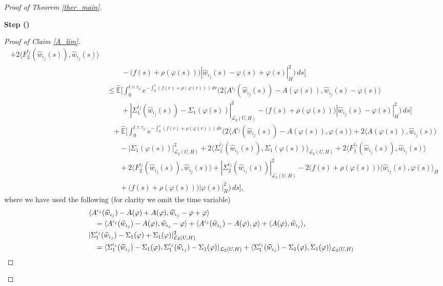 \documentclass[english,a4paper,11pt]{amsart}
\theoremstyle{plain}
\theoremstyle{definition}
\theoremstyle{remark}
\numberwithin{equation}{section}
\newcounter{lil1}
\newenvironment{step}
{\begin{list} { \bf Step (\Roman{lil1})}
		{ \usecounter{lil1}
			\setlength{\leftmargin}{0.0cm}
			\setlength{\topsep}{0.2cm}
			\setlength{\itemsep}{0.0cm}
			\setlength{\parsep}{0.1cm}
			\setlength{\itemindent}{0.8cm}
			\setlength{\parskip}{0.0cm}}}
	{\end{list}}
\newcounter{lil33}
\newcounter{lil1q}
\newcommand{\wh}{\widehat}
\newcommand{\la}{\langle}
\newcommand{\ra}{\rangle}
\newcommand{\EE}{ \mathbb{E} }
\begin{document}
\begin{proof}[Proof of Theorem \ref{ther_main}]
\begin{step}
\begin{proof}[Proof of Claim \ref{A_lim}]
\begin{align}
+ 2\la F_2^{\iota_j}(\wh{w}_{\iota_j}(s)),\wh{w}_{\iota_j}(s)\ra
	\\&\qquad \ \nonumber 
	-\big(f(s)+\rho(\varphi(s))\big) | \wh{w}_{\iota_j}(s)-\varphi(s)+\varphi(s) | _H^2 \bigg)\,ds\bigg]
	\\&\  \nonumber\leq 
		{\wh{\EE}}
	\bigg[\int_0^{t\wedge \tau_{\varphi}}e^{-\int_0^{s}(f(r)+\rho(\varphi(r)))\, dr}\bigg(2\la A^{\iota_j}( {\wh{w}}_{{\iota_j}}(s))-A(\varphi(s)), {\wh{w}}_{{\iota_j}}(s)-\varphi(s)\ra
	\\&\ \nonumber\qquad + | \Sigma_1^{{\iota_j}}(  {\wh{w}}_{{\iota_j}}(s))-\Sigma_1(\varphi(s)) | _{\mathcal{L}_2(U,H)}^2-\big(f(s)+\rho(\varphi(s))\big) | \wh{w}_{\iota_j}(s)-\varphi(s) | _H^2  \bigg)\,ds \bigg]
	\\&  \nonumber\quad + 
	{\wh{\EE}}
	\bigg[\int_0^{t\wedge \tau_{\varphi}} e^{-\int_0^{s}(f(r)+\rho(\varphi(r)))\, dr}\bigg(2\la A^{{\iota_j}}( {\wh{w}}_{{\iota_j}}(s))-A(\varphi(s)),\varphi(s)\ra +2\la A	(\varphi(s)),\wh{w}_{\iota_j}(s)\ra\\&\nonumber\qquad  - | \Sigma_1(\varphi(s)) | _{\mathcal{L}_2(U,H)}^2
	+2\la \Sigma_1^{{\iota_j}}(  {\wh{w}}_{{\iota_j}}(s)), \Sigma_1(\varphi(s))\ra_{\mathcal{L}_2(U,H)}
	+2\la  F_1^{\iota_j}(\wh{w}_{\iota_j}(s)),\wh{w}_{\iota_j}(s)\ra  \\& \nonumber\qquad+2\la  F_2^{\iota_j}(\wh{w}_{\iota_j}(s)),\wh{w}_{\iota_j}(s)\ra + | \Sigma_2^{\iota_j}(\wh{w}_{\iota_j}(s)) | _{\mathcal{L}_2(U,H)}^2 -2\big(f(s)+\rho(\varphi(s))\big)\la \wh{w}_{\iota_j}(s),\varphi(s)\ra_H \\& \qquad +\big(f(s)+\rho(\varphi(s))\big) | \varphi(s) | _H^2\bigg)\,ds \bigg], 
\end{align}where we have used the following (for clarity we omit the time variable)
\begin{align*}
&\hspace{-3mm}	\la A^{\iota_j}( {\wh{w}}_{{\iota_j}})-A(\varphi)+A(\varphi), {\wh{w}}_{{\iota_j}}-\varphi+\varphi\ra \\&= 
\la A^{\iota_j}( {\wh{w}}_{{\iota_j}})-A(\varphi), {\wh{w}}_{{\iota_j}}-\varphi\ra+\la A^{\iota_j}( {\wh{w}}_{{\iota_j}})-A(\varphi),\varphi\ra+ \la A(\varphi),\wh{w}_{\iota_j}\ra, 
\\
&\hspace{-3mm}	 | \Sigma_1^{{\iota_j}}(  {\wh{w}}_{{\iota_j}})-\Sigma_1(\varphi)+\Sigma_1(\varphi) | _{\mathcal{L}_2(U,H)}^2
 \\& = 
\la \Sigma_1^{{\iota_j}}(  {\wh{w}}_{{\iota_j}})-\Sigma_1(\varphi), \Sigma_1^{{\iota_j}}(  {\wh{w}}_{{\iota_j}})-\Sigma_1(\varphi)\ra_{\mathcal{L}_2(U,H)} + \la \Sigma_1^{{\iota_j}}(  {\wh{w}}_{{\iota_j}})-\Sigma_1(\varphi), \Sigma_1(\varphi)\ra_{\mathcal{L}_2(U,H)} 

\end{align*}
\end{proof}
\end{step}
\end{proof}
\end{document}
